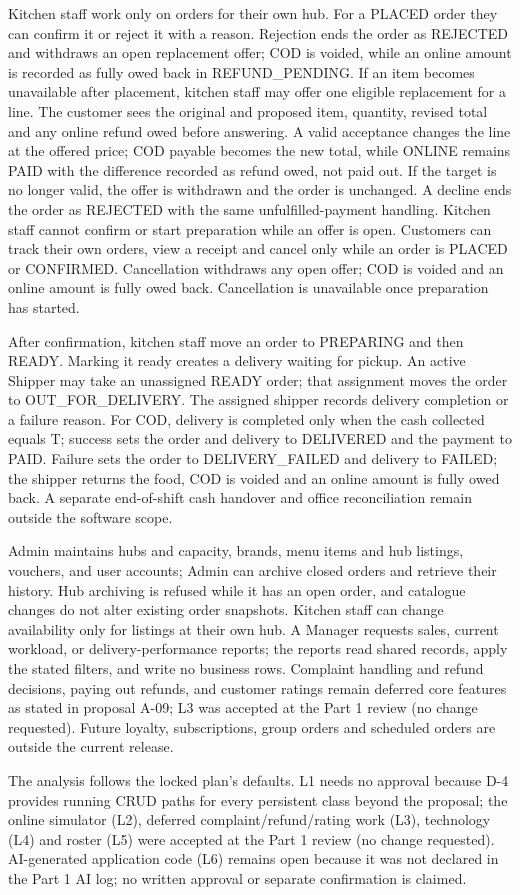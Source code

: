 Kitchen staff work only on orders for their own hub. For a PLACED order they can confirm it or reject it with a reason. Rejection ends the order as REJECTED and withdraws an open replacement offer; COD is voided, while an online amount is recorded as fully owed back in REFUND\_PENDING. If an item becomes unavailable after placement, kitchen staff may offer one eligible replacement for a line. The customer sees the original and proposed item, quantity, revised total and any online refund owed before answering. A valid acceptance changes the line at the offered price; COD payable becomes the new total, while ONLINE remains PAID with the difference recorded as refund owed, not paid out. If the target is no longer valid, the offer is withdrawn and the order is unchanged. A decline ends the order as REJECTED with the same unfulfilled-payment handling. Kitchen staff cannot confirm or start preparation while an offer is open. Customers can track their own orders, view a receipt and cancel only while an order is PLACED or CONFIRMED. Cancellation withdraws any open offer; COD is voided and an online amount is fully owed back. Cancellation is unavailable once preparation has started.

After confirmation, kitchen staff move an order to PREPARING and then READY. Marking it ready creates a delivery waiting for pickup. An active Shipper may take an unassigned READY order; that assignment moves the order to OUT\_FOR\_DELIVERY. The assigned shipper records delivery completion or a failure reason. For COD, delivery is completed only when the cash collected equals T; success sets the order and delivery to DELIVERED and the payment to PAID. Failure sets the order to DELIVERY\_FAILED and delivery to FAILED; the shipper returns the food, COD is voided and an online amount is fully owed back. A separate end-of-shift cash handover and office reconciliation remain outside the software scope.

Admin maintains hubs and capacity, brands, menu items and hub listings, vouchers, and user accounts; Admin can archive closed orders and retrieve their history. Hub archiving is refused while it has an open order, and catalogue changes do not alter existing order snapshots. Kitchen staff can change availability only for listings at their own hub. A Manager requests sales, current workload, or delivery-performance reports; the reports read shared records, apply the stated filters, and write no business rows. Complaint handling and refund decisions, paying out refunds, and customer ratings remain deferred core features as stated in proposal A-09; L3 was accepted at the Part 1 review (no change requested). Future loyalty, subscriptions, group orders and scheduled orders are outside the current release.

The analysis follows the locked plan's defaults. L1 needs no approval because D-4 provides running CRUD paths for every persistent class beyond the proposal; the online simulator (L2), deferred complaint/refund/rating work (L3), technology (L4) and roster (L5) were accepted at the Part 1 review (no change requested). AI-generated application code (L6) remains open because it was not declared in the Part 1 AI log; no written approval or separate confirmation is claimed.
